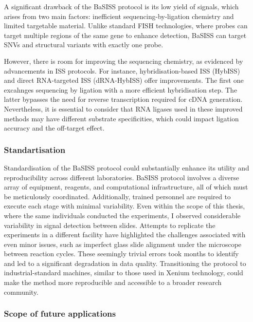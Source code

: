 A significant drawback of the \ac{BaSISS} protocol is its low yield of signals, which arises from two main factors: inefficient sequencing-by-ligation chemistry and limited targetable material. Unlike standard FISH technologies, where probes can target multiple regions of the same gene to enhance detection, \ac{BaSISS} can target \acp{SNV} and structural variants with exactly one probe.

However, there is room for improving the sequencing chemistry, as evidenced by advancements in \ac{ISS} protocols. For instance, hybridisation-based \ac{ISS} (HybISS) \parencite{Gyllborg2020-uq} and direct RNA-targeted \ac{ISS} (dRNA-HybISS) \parencite{Lee2022-ha} offer improvements. The first one excahnges sequencing by ligation with a more efficient hybridisation step. The latter bypasses the need for reverse transcription required for cDNA generation. Nevertheless, it is essential to consider that RNA ligases used in these improved methods may have different substrate specificities, which could impact ligation accuracy and the off-target effect.

\subsubsection*{Standartisation}

Standardisation of the \ac{BaSISS} protocol could substantially enhance its utility and reproducibility across different laboratories. \ac{BaSISS} protocol involves a diverse array of equipment, reagents, and computational infrastructure, all of which must be meticulously coordinated. Additionally, trained personnel are required to execute each stage with minimal variability. Even within the scope of this thesis, where the same individuals conducted the experiments, I observed considerable variability in signal detection between slides. Attempts to replicate the experiments in a different facility have highlighted the challenges associated with even minor issues, such as imperfect glass slide alignment under the microscope between reaction cycles. These seemingly trivial errors took months to identify and led to a significant degradation in data quality. Transitioning the protocol to industrial-standard machines, similar to those used in Xenium technology, could make the method more reproducible and accessible to a broader research community.

\subsubsection*{Scope of future applications}

